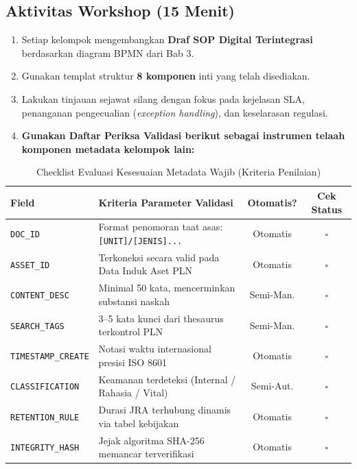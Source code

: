 \documentclass[12pt,a4paper]{report}
\begin{document}
\subsection*{Aktivitas Workshop (15 Menit)}
\begin{enumerate}[leftmargin=*]
    \item Setiap kelompok mengembangkan \textbf{Draf SOP Digital Terintegrasi} berdasarkan diagram BPMN dari Bab 3.
    \item Gunakan templat struktur \textbf{8 komponen} inti yang telah disediakan.
    \item Lakukan tinjauan sejawat silang dengan fokus pada kejelasan SLA, penanganan pengecualian (\textit{exception handling}), dan keselarasan regulasi.
    \item \textbf{Gunakan Daftar Periksa Validasi berikut sebagai instrumen telaah komponen metadata kelompok lain:}
\end{enumerate}

\begin{table}[htbp]
\centering
\small
\caption{Checklist Evaluasi Kesesuaian Metadata Wajib (Kriteria Penilaian)}
\begin{tabularx}{\textwidth}{@{} l X c c @{}}
\toprule
\textbf{Field} & \textbf{Kriteria Parameter Validasi} & \textbf{Otomatis?} & \textbf{Cek Status} \\
\midrule
\texttt{DOC\_ID} & Format penomoran taat asas: \texttt{[UNIT]/[JENIS]...} & Otomatis & $\square$ \\
\texttt{ASSET\_ID} & Terkoneksi secara valid pada Data Induk Aset PLN & Otomatis & $\square$ \\
\texttt{CONTENT\_DESC} & Minimal 50 kata, mencerminkan substansi naskah & Semi-Man. & $\square$ \\
\texttt{SEARCH\_TAGS} & 3--5 kata kunci dari thesaurus terkontrol PLN & Semi-Man. & $\square$ \\
\texttt{TIMESTAMP\_CREATE} & Notasi waktu internasional presisi ISO 8601 & Otomatis & $\square$ \\
\texttt{CLASSIFICATION} & Keamanan terdeteksi (Internal / Rahasia / Vital) & Semi-Aut. & $\square$ \\
\texttt{RETENTION\_RULE} & Durasi JRA terhubung dinamis via tabel kebijakan & Otomatis & $\square$ \\
\texttt{INTEGRITY\_HASH} & Jejak algoritma SHA-256 memancar terverifikasi & Otomatis & $\square$ \\
\bottomrule
\end{tabularx}
\end{table}
\end{document}
